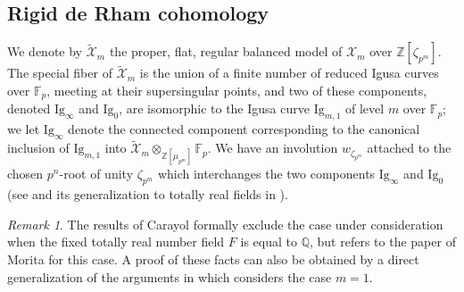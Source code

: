 \documentclass[a4paper,11pt]{amsart}
\numberwithin{equation}{section}
\theoremstyle{plain}
\theoremstyle{definition}
\theoremstyle{remark}
\newtheorem{remark}[theorem]{Remark}
\newcommand{\Q}{\mathbb Q}
\newcommand{\Z}{\mathbb Z}
\newcommand{\F}{\mathbb F}
\begin{document}
 \subsection{Rigid de Rham cohomology}\label{sec:9.1.2}
We denote by $\widetilde{\mathcal{X}}_m$ the proper, flat, regular balanced model of ${\mathcal{X}}_m$ over $\Z[\zeta_{p^m}]$. The special fiber of $\widetilde{\mathcal{X}}_m$ is the union of a finite number of reduced Igusa curves over $\F_p$, meeting at their supersingular points, and two of these components, denoted $\mathrm{Ig}_\infty$ and $\mathrm{Ig}_0$, are isomorphic to the Igusa curve $\mathrm{Ig}_{m,1}$ of level $m$ over $\F_p$; we let $\mathrm{Ig}_\infty$ denote the connected component corresponding to the canonical inclusion of $\mathrm{Ig}_{m,1}$ into $\widetilde{\mathcal{X}}_m\otimes_{\Z[\mu_{p^m}]}\F_p$. We have an involution $w_{\zeta_{p^m}}$ attached to the chosen $p^n$-root of unity $\zeta_{p^m}$ which interchanges the two components $\mathrm{Ig}_\infty$ and $\mathrm{Ig}_0$ 
(see \cite{Morita} and its generalization to totally real fields in \cite{Carayol-Shimura}). 

\begin{remark} 
The results of Carayol \cite{Carayol-Shimura} 
formally exclude the case under consideration when the fixed totally real number field $F$ is equal to $\Q$, but refers to the paper of Morita \cite{Morita} for this case. A proof of these facts can also be obtained by a direct generalization of the arguments in \cite[Theorem 4.10]{Buz} which considers the case $m=1$. 
\end{remark}
\end{document}
